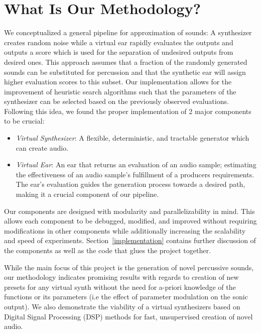 \documentclass[\main/thesis.tex]{subfiles}
\begin{document}
\section{What Is Our Methodology?}
\label{sec_methodology}
We conceptualized a general pipeline for approximation of sounds: A synthesizer creates random noise while a virtual ear rapidly evaluates the outputs and outputs a score which is used for the separation of undesired outputs from desired ones. This approach assumes that a fraction of the randomly generated sounds can be substituted for percussion and that the synthetic ear will assign higher evaluation scores to this subset. Our implementation allows for the improvement of heuristic search algorithms such that the parameters of the synthesizer can be selected based on the previously observed evaluations. Following this idea, we found the proper implementation of 2 major components to be crucial:

\begin{itemize}
    \item \textit{Virtual Synthesizer}: A flexible, deter\-min\-istic, and tract\-able gener\-ator which can create audio. 
    \item \textit{Virtual Ear}: An ear that returns an evaluation of an audio sample; estimating the effectiveness of an audio sample's fulfillment of a producers requirements. The ear's evaluation guides the generation process towards a desired path, making it a crucial component of our pipeline. 
\end{itemize}
Our components are designed with modularity and parallelizability in mind. This allows each component to be debugged, modified, and improved without requiring modifications in other components while additionally increasing the scalability and speed of experiments. 
Section~\ref{implementation} contains further discussion of the components as well as the code that glues the project together.

While the main focus of this project is the generation of novel percussive sounds, our methodology indicates promising results with regards to creation of new presets for any virtual synth without the need for a-priori knowledge of the functions or its parameters (i.e the effect of parameter modulation on the sonic output). We also demonstrate the viability of a virtual synthesizers based on Digital Signal Processing (DSP) methods for fast, unsupervised creation of novel audio. 
\end{document}
